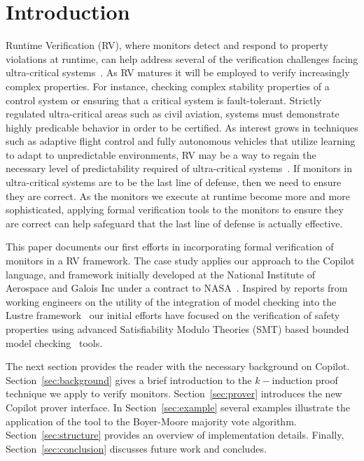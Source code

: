 \section{Introduction}\label{sec:intro}
Runtime Verification (RV), where monitors detect and respond to
property violations at runtime, can help address several of the
verification challenges facing ultra-critical
systems~\cite{pike-rv-11}.  As RV matures
it will be employed to verify increasingly complex 
properties. For instance, checking complex stability properties of a
control system or ensuring that a critical system is fault-tolerant.
Strictly regulated ultra-critical areas such as civil aviation,
systems must demonstrate highly predicable behavior in order to be
certified. As interest grows in techniques such as adaptive flight
control and fully autonomous vehicles that utilize learning to adapt
to unpredictable environments, RV may be a way to regain the necessary
level of predictability required of ultra-critical
systems~\cite{simplex}.  If
monitors in ultra-critical systems are to be the last line of defense,
then we need to ensure they are correct.  As the monitors we execute
at runtime become more and more sophisticated, applying formal
verification tools to the monitors to ensure they are correct can help
safeguard that the last line of defense is actually effective. 


This paper documents our first efforts in incorporating formal
verification of monitors in a RV framework.  The case study applies
our approach to the Copilot language, and framework initially
developed at the National Institute of Aerospace and Galois Inc under
a contract to NASA~\cite{copilot,pike-isse-13}.  Inspired by reports
from working engineers on the utility of the integration of model
checking into the Lustre framework~\cite{Hagen08} our initial efforts
have focused on the verification of safety properties using advanced
Satisfiability Modulo Theories (SMT) based bounded model
checking~\cite{ClarkeBounded01} tools.

 
The next section provides the reader with the necessary background on
Copilot. Section~\ref{sec:background}  gives a brief introduction to
the 
$k-$induction proof technique we apply to verify monitors. Section~\ref{sec:prover} introduces the new Copilot prover interface. In Section~\ref{sec:example}  several examples illustrate the
application of the tool to the Boyer-Moore majority vote
algorithm. Section~\ref{sec:structure} provides an overview of
implementation details. Finally, Section~\ref{sec:conclusion}
discusses future work and concludes. 

